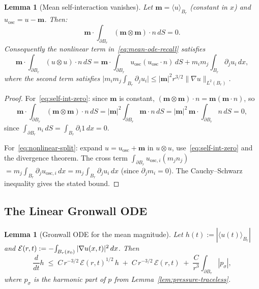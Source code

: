 \documentclass[11pt]{article}
\newtheorem{lemma}[theorem]{Lemma}
\theoremstyle{definition}
\theoremstyle{remark}
\newcommand{\Xint}{\mathop{\mathchoice{\vcenter{\hbox{$\displaystyle-$}}}%
  {\vcenter{\hbox{$\textstyle-$}}}%
  {\vcenter{\hbox{$\scriptstyle-$}}}%
  {\vcenter{\hbox{$\scriptscriptstyle-$}}}}\!\int}
\begin{document}
\begin{lemma}[Mean self-interaction vanishes]
\label{lem:mean-self-int}
  Let $\mathbf{m}=\langle u\rangle_{B_r}$ (constant in $x$) and
  $u_{\mathrm{osc}}=u-\mathbf{m}$.  Then:
  \begin{equation}\label{eq:self-int-zero}
    \mathbf{m}\cdot\int_{\partial B_r}\!(\mathbf{m}\otimes\mathbf{m})\cdot n\,dS = 0.
  \end{equation}
  Consequently the nonlinear term in~\eqref{eq:mean-ode-recall} satisfies
  \begin{equation}\label{eq:nonlinear-split}
    \mathbf{m}\cdot\int_{\partial B_r}\!(u\otimes u)\cdot n\,dS
    = \mathbf{m}\cdot\int_{\partial B_r}\!u_{\mathrm{osc}}(u_{\mathrm{osc}}\cdot n)\,dS
      + m_im_j\int_{B_r}\!\partial_j u_i\,dx,
  \end{equation}
  where the second term satisfies
  $\bigl|m_im_j\int_{B_r}\partial_j u_i\bigr|
   \leq |\mathbf{m}|^2 r^{3/2}\|\nabla u\|_{L^2(B_r)}$.
\end{lemma}

\begin{proof}
  For~\eqref{eq:self-int-zero}: since $\mathbf{m}$ is constant,
  $(\mathbf{m}\otimes\mathbf{m})\cdot n = \mathbf{m}(\mathbf{m}\cdot n)$, so
  \[
    \mathbf{m}\cdot\int_{\partial B_r}\!(\mathbf{m}\otimes\mathbf{m})\cdot n\,dS
    = |\mathbf{m}|^2\int_{\partial B_r}\!\mathbf{m}\cdot n\,dS
    = |\mathbf{m}|^2\,\mathbf{m}\cdot\int_{\partial B_r}\!n\,dS = 0,
  \]
  since $\int_{\partial B_r} n_i\,dS = \int_{B_r}\partial_i 1\,dx = 0$.

  For~\eqref{eq:nonlinear-split}: expand $u=u_{\mathrm{osc}}+\mathbf{m}$ in $u\otimes u$,
  use~\eqref{eq:self-int-zero} and the divergence theorem.
  The cross term $\int_{\partial B_r} u_{\mathrm{osc},i}(m_j n_j)$
  $= m_j\int_{B_r}\partial_j u_{\mathrm{osc},i}\,dx = m_j\int_{B_r}\partial_j u_i\,dx$
  (since $\partial_j m_i=0$).
  The Cauchy--Schwarz inequality gives the stated bound.
\end{proof}

\subsection{The Linear Gronwall ODE}

\begin{lemma}[Gronwall ODE for the mean magnitude]
\label{lem:mean-gronwall}
  Let $h(t):=|\langle u(t)\rangle_{B_r}|$ and
  $\mathcal{E}(r,t):=\Xint_{B_r(x_0)}|\nabla u(x,t)|^2\,dx$.
  Then
  \begin{equation}\label{eq:gronwall-h}
    \frac{d}{dt}h
    \;\leq\; C\,r^{-3/2}\,\mathcal{E}(r,t)^{1/2}\,h
             \;+\; C\,r^{-3/2}\,\mathcal{E}(r,t)
             \;+\; \frac{C}{r^3}\int_{\partial B_r}\!|p_\sigma|,
  \end{equation}
  where $p_\sigma$ is the harmonic part of $p$ from
  Lemma~\ref{lem:pressure-traceless}.
\end{lemma}
\end{document}
